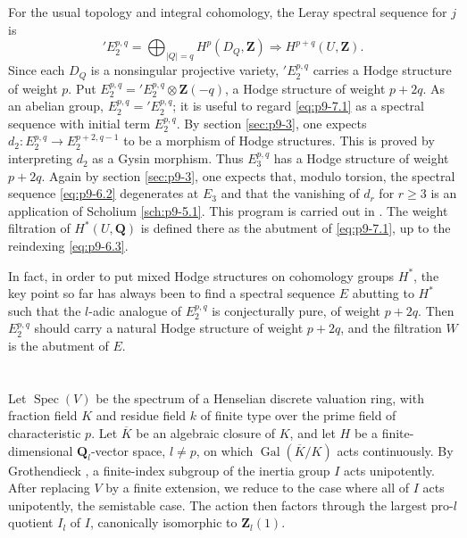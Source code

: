 \documentclass[11pt]{amsart}
\theoremstyle{plain}
\theoremstyle{definition}
\theoremstyle{remark}
\DeclareMathOperator{\Spec}{Spec}
\DeclareMathOperator{\Gal}{Gal}
\newcommand{\Q}{\mathbf{Q}}
\newcommand{\Z}{\mathbf{Z}}
\begin{document}
\section{}\label{sec:p9-7}
For the usual topology and integral cohomology, the Leray spectral sequence for $j$ is
\begin{equation}\label{eq:p9-7.1}
{}'E_2^{p,q}=\bigoplus_{|Q|=q}H^p(D_Q,\Z)\Rightarrow H^{p+q}(U,\Z).
\end{equation}
Since each $D_Q$ is a nonsingular projective variety, ${}'E_2^{p,q}$ carries a Hodge structure of weight $p$. Put $E_2^{p,q}={}'E_2^{p,q}\otimes\Z(-q)$, a Hodge structure of weight $p+2q$. As an abelian group, $E_2^{p,q}={}'E_2^{p,q}$; it is useful to regard \eqref{eq:p9-7.1} as a spectral sequence with initial term $E_2^{p,q}$. By section \ref{sec:p9-3}, one expects $d_2:E_2^{p,q}\to E_2^{p+2,q-1}$ to be a morphism of Hodge structures. This is proved by interpreting $d_2$ as a Gysin morphism. Thus $E_3^{p,q}$ has a Hodge structure of weight $p+2q$. Again by section \ref{sec:p9-3}, one expects that, modulo torsion, the spectral sequence \eqref{eq:p9-6.2} degenerates at $E_3$ and that the vanishing of $d_r$ for $r\ge3$ is an application of Scholium \ref{sch:p9-5.1}. This program is carried out in \cite[3.2]{Hodge2}. The weight filtration of $H^*(U,\Q)$ is defined there as the abutment of \eqref{eq:p9-7.1}, up to the reindexing \eqref{eq:p9-6.3}.

In fact, in order to put mixed Hodge structures on cohomology groups $H^*$, the key point so far has always been to find a spectral sequence $E$ abutting to $H^*$ such that the $l$-adic analogue of $E_2^{p,q}$ is conjecturally pure, of weight $p+2q$. Then $E_2^{p,q}$ should carry a natural Hodge structure of weight $p+2q$, and the filtration $W$ is the abutment of $E$.

\section{}\label{sec:p9-8}
Let $\Spec(V)$ be the spectrum of a Henselian discrete valuation ring, with fraction field $K$ and residue field $k$ of finite type over the prime field of characteristic $p$. Let $\overline K$ be an algebraic closure of $K$, and let $H$ be a finite-dimensional $\Q_l$-vector space, $l\neq p$, on which $\Gal(\overline K/K)$ acts continuously. By Grothendieck \cite[Appendix]{Tate}, a finite-index subgroup of the inertia group $I$ acts unipotently. After replacing $V$ by a finite extension, we reduce to the case where all of $I$ acts unipotently, the semistable case. The action then factors through the largest pro-$l$ quotient $I_l$ of $I$, canonically isomorphic to $\Z_l(1)$.
\end{document}
